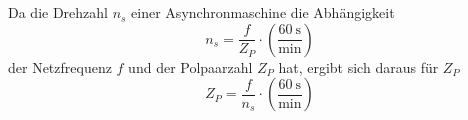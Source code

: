 \chapter{}\label{ex:aufg4}
%
\section{}\label{sec:aufg4a}
Da die Drehzahl $n_s$ einer Asynchronmaschine die Abhängigkeit
\begin{equation}
	n_s = \frac{f}{Z_P}\cdot \left(\frac{60~\mathrm{s}}{\mathrm{min}}\right)
\end{equation}
der Netzfrequenz $f$ und der Polpaarzahl $Z_P$  hat, ergibt sich daraus für $Z_P$
\begin{equation}
	Z_P = \frac{f}{n_s}\cdot \left(\frac{60~\mathrm{s}}{\mathrm{min}}\right)
\end{equation}
%

\section{}\label{sec:aufg4b}